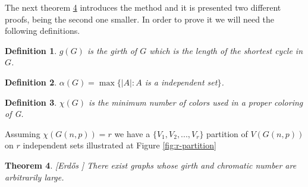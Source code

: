 \documentclass[12pt,twoside,a4paper,bibliography=totocnumbered]{book}
\numberwithin{equation}{section}
\newtheorem{theorem}             {Theorem}[section]
\newtheorem{definition}	[theorem] {Definition}
\theoremstyle{remark}
\begin{document}


The next theorem \ref{erdoss} introduces the method and it is presented two different proofs, being the second one smaller. In order to prove it we will need the following definitions.

\begin{definition}\label{def:girth}
$g(G)$ is the girth of $G$ which is the length of the shortest cycle in $G$. 
\end{definition}
\begin{definition}\label{def:independencenumber}
$\alpha(G) = \max\{|A|: A$ is a independent set$\}$.
\end{definition}
\begin{definition}\label{def:chromaticnumber}
$\chi(G)$ is the minimum number of colors used in a proper coloring of G.
\end{definition}
Assuming $\chi(G(n,p)) = r$ we have a $\{V_1,V_2,...,V_r\}$ partition of $V(G(n,p))$ on $r$ independent sets illustrated at Figure \ref{fig:r-partition}


\begin{theorem}\label{erdoss}[{Erd\H{o}s \cite{Er59}}] There exist graphs whose girth and chromatic number are arbitrarily large.
\end{theorem}
\end{document}
